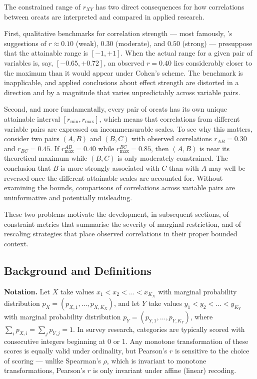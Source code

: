 \documentclass[
  12pt,
]{article}
\theoremstyle{plain}
\theoremstyle{definition}
\theoremstyle{remark}
\begin{document}
The constrained range of \(r_{XY}\) has two direct consequences for how
correlations between orcats are interpreted and compared in applied
research.

First, qualitative benchmarks for correlation strength --- most
famously, \textcite{cohe02-applied}'s suggestions of \(r \approx 0.10\)
(weak), \(0.30\) (moderate), and \(0.50\) (strong) --- presuppose that
the attainable range is \([-1, +1]\). When the actual range for a given
pair of variables is, say, \([-0.65, +0.72]\), an observed \(r = 0.40\)
lies considerably closer to the maximum than it would appear under
Cohen's scheme. The benchmark is inapplicable, and applied conclusions
about effect strength are distorted in a direction and by a magnitude
that varies unpredictably across variable pairs.

Second, and more fundamentally, every pair of orcats has its own unique
attainable interval \([r_{\min}, r_{\max}]\), which means that
correlations from different variable pairs are expressed on
incommensurable scales. To see why this matters, consider two pairs
\((A,B)\) and \((B,C)\) with observed correlations \(r_{AB} = 0.30\) and
\(r_{BC} = 0.45\). If \(r_{\max}^{AB} = 0.40\) while
\(r_{\max}^{BC} = 0.85\), then \((A,B)\) is near its theoretical maximum
while \((B,C)\) is only moderately constrained. The conclusion that
\(B\) is more strongly associated with \(C\) than with \(A\) may well be
reversed once the different attainable scales are accounted for. Without
examining the bounds, comparisons of correlations across variable pairs
are uninformative and potentially misleading.

These two problems motivate the development, in subsequent sections, of
constraint metrics that summarise the severity of marginal restriction,
and of rescaling strategies that place observed correlations in their
proper bounded context.

\subsection{Background and
Definitions}\label{background-and-definitions}

\textbf{Notation.} Let \(X\) take values \(x_1 < x_2 < \dots < x_{K_X}\)
with marginal probability distribution
\(p_X = (p_{X,1}, \dots, p_{X,K_X})\), and let \(Y\) take values
\(y_1 < y_2 < \dots < y_{K_Y}\) with marginal probability distribution
\(p_Y = (p_{Y,1}, \dots, p_{Y,K_Y})\), where
\(\sum_i p_{X,i} = \sum_j p_{Y,j} = 1\). In survey research, categories
are typically scored with consecutive integers beginning at 0 or 1. Any
monotone transformation of these scores is equally valid under
ordinality, but Pearson's \(r\) is sensitive to the choice of scoring
--- unlike Spearman's \(\rho\), which is invariant to monotone
transformations, Pearson's \(r\) is only invariant under affine (linear)
recoding.
\end{document}
